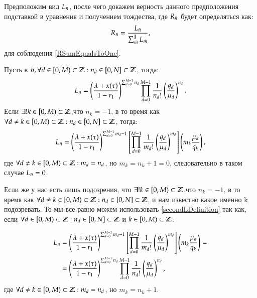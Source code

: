 Предположим вид \(\Ln\), после чего докажем верность 
данного предположения подставкой в уравнения и получением тождества, 
где \(\Rn\) будет определяться как:
\[\Rn = \frac{\Ln}{\sum_{\bar{m}}^{\Jt}\Lm},\]
для соблюдения \eqref{RSumEqualsToOne}.

Пусть в \(\bar{n}, \forall d \in \Mt: n_d \in \Nt \), тогда:
\begin{equation} \label{firstLDefinition}
    \Ln = \Ldefinition{n}{d}.
\end{equation}
Если \(\exists! k \in \Mt \),что \(n_k=-1\), в то время как 
    \(\forall d \neq k \in \Mt: n_d \in \Nt\), тогда:
\begin{equation} \label{secondLDefinition}
    \Ln = \LminusDefinition{m}{d}{k},
\end{equation}
где \(\forall d \neq k \in \Mt: m_d = n_d\), но \(m_k = n_k + 1 = 0\),
следовательно в таком случае \(\Ln = 0\).

Если же у нас есть лишь подозрения, что 
\(\exists! k \in \Mt \),что \(n_k=-1\), в то время как 
\(\forall d \neq k \in \Mt: n_d \in \Nt\), 
и нам известно какое именно k подозревать.
То мы все равно можем использовать \eqref{secondLDefinition} так как, 
если \(\forall d \in \Mt: n_d \in \Nt\) и \(k \in \Mt\):

\begin{equation}\begin{aligned}
    \Ln &= \LminusDefinition{m}{d}{k} = \\
        &= \Ldefinition{n}{d},
\end{aligned}\end{equation}
где \(\forall d \neq k \in \Mt: m_d = n_d\), но \(m_k = n_k + 1\).
 
